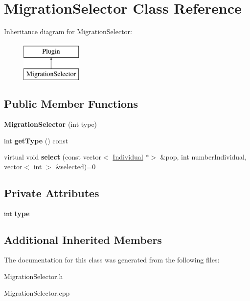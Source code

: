 \hypertarget{classMigrationSelector}{}\section{Migration\+Selector Class Reference}
\label{classMigrationSelector}
Inheritance diagram for Migration\+Selector\+:\begin{figure}[H]
\begin{center}
\leavevmode
\includegraphics[height=2.000000cm]{d9/d33/classMigrationSelector}
\end{center}
\end{figure}
\subsection*{Public Member Functions}
\begin{DoxyCompactItemize}
\item 
\mbox{\label{classMigrationSelector_a1257aad41c61a0e3aa5e902a816a5a9d}} 
{\bfseries Migration\+Selector} (int type)
\item 
\mbox{\label{classMigrationSelector_a5d5f69c022b4a082af7f661ee89c9459}} 
int {\bfseries get\+Type} () const
\item 
\mbox{\label{classMigrationSelector_a471dfd19b550c5436979439fda76e9f1}} 
virtual void {\bfseries select} (const vector$<$ \mbox{\hyperlink{classIndividual}{Individual}} $\ast$$>$ \&pop, int number\+Individual, vector$<$ int $>$ \&selected)=0
\end{DoxyCompactItemize}
\subsection*{Private Attributes}
\begin{DoxyCompactItemize}
\item 
\mbox{\label{classMigrationSelector_a91a77888e27312353fd442e6c59641db}} 
int {\bfseries type}
\end{DoxyCompactItemize}
\subsection*{Additional Inherited Members}


The documentation for this class was generated from the following files\+:\begin{DoxyCompactItemize}
\item 
Migration\+Selector.\+h\item 
Migration\+Selector.\+cpp\end{DoxyCompactItemize}
